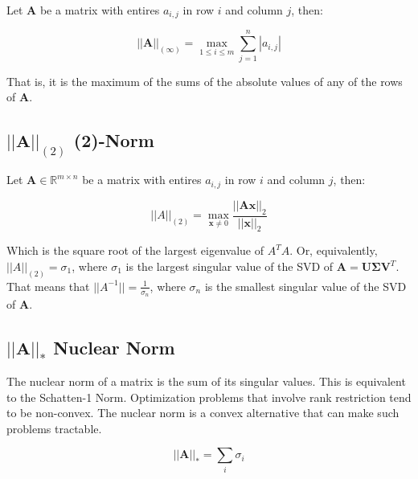 Let $\mathbf{A}$ be a matrix with entires $a_{i,j}$ in row $i$ and column $j$, then:

\begin{equation}
||\mathbf{A}||_{(\infty)} = \max_{1\leq i \leq m} \sum^n_{j=1} |a_{i,j} |
\end{equation}

That is, it is the maximum of the sums of the absolute values of any of the rows of $\mathbf{A}$.

\subsection{$||\mathbf{A}||_{(2)}$ (2)-Norm}
\label{sec:2norm}

Let $\mathbf{A} \in \mathbb{R}^{m\times n}$ be a matrix with entires $a_{i,j}$ in row $i$ and column $j$, then:

\begin{equation}
||A||_{(2)} = \max_{\mathbf{x}\neq 0} \frac{||\mathbf{Ax}||_2}{||\mathbf{x}||_2}
\end{equation}

Which is the square root of the largest eigenvalue of $A^T A$. Or, equivalently, $||A||_{(2)} = \sigma_1$, where $\sigma_1$ is the largest singular value of the SVD of $\mathbf{A} = \mathbf{U\Sigma V}^T$. That means that $||A^{-1}|| = \frac{1}{\sigma_n}$, where $\sigma_n$ is the smallest singular value of the SVD of $\mathbf{A}$. 


\subsection{$||\mathbf{A}||_{*}$ Nuclear Norm}
\label{sec:nuclearnorm}
The nuclear norm of a matrix is the sum of its singular values. This is equivalent to the Schatten-1 Norm. Optimization problems that involve rank restriction tend to be non-convex. The nuclear norm is a convex alternative that can make such problems tractable.

\begin{equation}
||\mathbf{A}||_{*} = \sum_i \sigma_i 
\end{equation}

